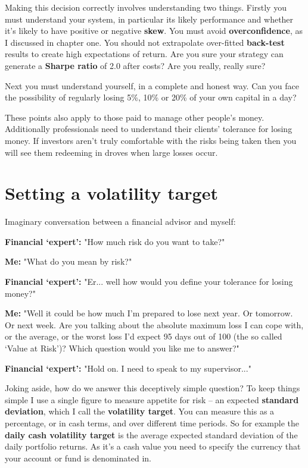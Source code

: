 Making this decision correctly involves understanding two things. Firstly you must understand your system, in particular its likely performance and whether it's likely to have positive or negative \textbf{skew}. You must avoid \textbf{overconfidence}, as I discussed in chapter one. You should not extrapolate over-fitted \textbf{back-test} results to create high expectations of return. Are you sure your strategy can generate a \textbf{Sharpe ratio} of 2.0 after costs? Are you really, really sure?

Next you must understand yourself, in a complete and honest way. Can you face the possibility of regularly losing 5\%, 10\% or 20\% of your own capital in a day?

These points also apply to those paid to manage other people's money. Additionally professionals need to understand their clients' tolerance for losing money. If investors aren't truly comfortable with the risks being taken then you will see them redeeming in droves when large losses occur.

\section*{Setting a volatility target}  {}

Imaginary conversation between a financial advisor and myself:

\noindent\textbf{Financial ‘expert':} "How much risk do you want to take?"

\noindent\textbf{Me:} "What do you mean by risk?"

\noindent\textbf{Financial ‘expert':} "Er... well how would you define your tolerance for losing money?"

\noindent\textbf{Me:} "Well it could be how much I'm prepared to lose next year. Or tomorrow. Or next week. Are you talking about the absolute maximum loss I can cope with, or the average, or the worst loss I'd expect 95 days out of 100 (the so called ‘Value at Risk')? Which question would you like me to answer?"

\noindent\textbf{Financial ‘expert':} "Hold on. I need to speak to my supervisor..."

Joking aside, how do we answer this deceptively simple question? To keep things simple I use a single figure to measure appetite for risk -- an expected \textbf{standard deviation}, which I call the \textbf{volatility target}. You can measure this as a percentage, or in cash terms, and over different time periods. So for example the \textbf{daily cash volatility target} is the average expected standard deviation of the daily portfolio returns. As it's a cash value you need to specify the currency that your account or fund is denominated in.

